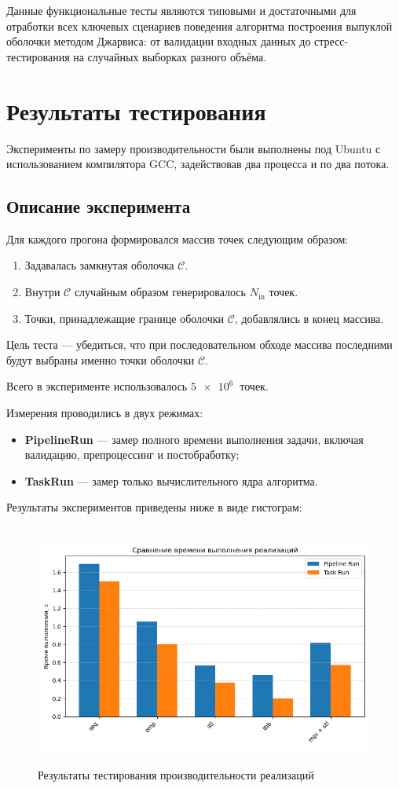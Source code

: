 \documentclass[12pt,a4paper]{article}
\begin{document}
Данные функциональные тесты являются типовыми и достаточными для отработки всех ключевых сценариев поведения алгоритма построения выпуклой оболочки методом Джарвиса: от валидации входных данных до стресс-тестирования на случайных выборках разного объёма.

\section{Результаты тестирования}
Эксперименты по замеру производительности были выполнены под Ubuntu с использованием компилятора GCC, задействовав два процесса и по два потока.

\subsection*{Описание эксперимента}
Для каждого прогона формировался массив точек следующим образом:
\begin{enumerate}
  \item Задавалась замкнутая оболочка \(\mathcal{C}\).
  \item Внутри \(\mathcal{C}\) случайным образом генерировалось \(N_{\mathrm{in}}\) точек.
  \item Точки, принадлежащие границе оболочки \(\mathcal{C}\), добавлялись в конец массива.
\end{enumerate}

Цель теста — убедиться, что при последовательном обходе массива последними будут выбраны именно точки оболочки \(\mathcal{C}\).

Всего в эксперименте использовалось \(\SI{5e6}{}\) точек.

Измерения проводились в двух режимах:

\begin{itemize}
    \item \textbf{PipelineRun} — замер полного времени выполнения задачи, включая валидацию, препроцессинг и постобработку;
    \item \textbf{TaskRun} — замер только вычислительного ядра алгоритма.
\end{itemize}

Результаты экспериментов приведены ниже в виде гистограм:

\begin{figure}[H]
\centering
\includegraphics[height=8cm]{img/perf_stat_info_1.png}
\caption{\label{fig:visualClass} Результаты тестирования производительности реализаций}
\end{figure}
\end{document}

